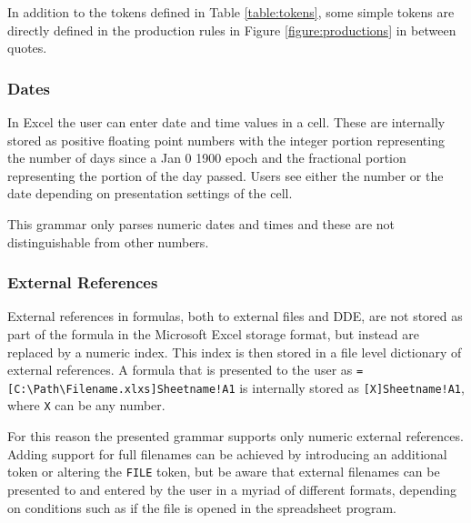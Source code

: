 \documentclass[conference]{IEEEtran}
\begin{document}
In addition to the tokens defined in Table \ref{table:tokens}, some simple tokens are directly defined in the production rules in Figure \ref{figure:productions} in between quotes.

\subsubsection{\textbf{Dates}}

In Excel the user can enter date and time values in a cell.
These are internally stored as positive floating point numbers with the integer portion representing the number of days since a Jan 0 1900 epoch and the fractional portion representing the portion of the day passed.
Users see either the number or the date depending on presentation settings of the cell.

This grammar only parses numeric dates and times and these are not distinguishable from other numbers.

\subsubsection{\textbf{External References}}

External references in formulas, both to external files and DDE, are not stored as part of the formula in the Microsoft Excel storage format, but instead are replaced by a numeric index.
This index is then stored in a file level dictionary of external references.
A formula that is presented to the user as \texttt{=[C:\textbackslash Path\textbackslash Filename.xlxs]Sheetname!A1} is internally stored as \texttt{[X]Sheetname!A1}, where \texttt{X} can be any number.

For this reason the presented grammar supports only numeric external references.
Adding support for full filenames can be achieved by introducing an additional token or altering the \texttt{FILE} token, but be aware that external filenames can be presented to and entered by the user in a myriad of different formats, depending on conditions such as if the file is opened in the spreadsheet program.
\end{document}
